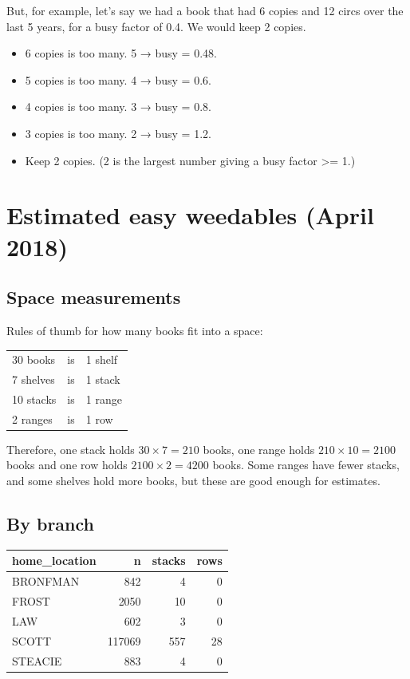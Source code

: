 \documentclass[11pt]{article}
\begin{document}
But, for example, let's say we had a book that had 6 copies and 12 circs over the last 5 years, for a busy factor of 0.4.  We would keep 2 copies.

\begin{itemize}
\item 6 copies is too many.  5 → busy = 0.48.
\item 5 copies is too many.  4 → busy = 0.6.
\item 4 copies is too many.  3 → busy = 0.8.
\item 3 copies is too many.  2 → busy = 1.2.
\item Keep 2 copies.  (2 is the largest number giving a busy factor >= 1.)
\end{itemize}

\section*{Estimated easy weedables (April 2018)}
\label{sec:orgbb92aee}

\subsection*{Space measurements}
\label{sec:org1fb5084}

Rules of thumb for how many books fit into a space:

\begin{center}
\begin{tabular}{lll}
30 books & is & 1  shelf\\
7 shelves & is & 1 stack\\
10 stacks & is & 1 range\\
2 ranges & is & 1 row\\
\end{tabular}
\end{center}

Therefore, one stack holds \(30 \times 7 = 210\) books, one range holds \(210 \times 10 = 2100\) books and one row holds \(2100 \times 2 = 4200\) books.  Some ranges have fewer stacks, and some shelves hold more books, but these are good enough for estimates.

\subsection*{By branch}
\label{sec:org71cf9ee}

\begin{center}
\begin{tabular}{lrrr}
home\_location & n & stacks & rows\\
\hline
BRONFMAN & 842 & 4 & 0\\
FROST & 2050 & 10 & 0\\
LAW & 602 & 3 & 0\\
SCOTT & 117069 & 557 & 28\\
STEACIE & 883 & 4 & 0\\
\end{tabular}
\end{center}
\end{document}
